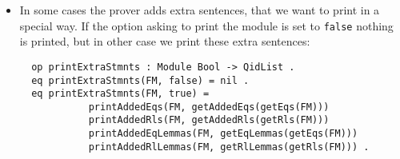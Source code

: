 \begin{itemize}
\item
In some cases the prover adds extra sentences, that we want to print
in a special way. If the option asking to print the module is set to \verb"false"
nothing is printed, but in other case we print these extra sentences:

{\codesize
\begin{verbatim}
  op printExtraStmnts : Module Bool -> QidList .
  eq printExtraStmnts(FM, false) = nil .
  eq printExtraStmnts(FM, true) =
            printAddedEqs(FM, getAddedEqs(getEqs(FM)))
            printAddedRls(FM, getAddedRls(getRls(FM)))
            printAddedEqLemmas(FM, getEqLemmas(getEqs(FM)))
            printAddedRlLemmas(FM, getRlLemmas(getRls(FM))) .
\end{verbatim}
}

{\codesize
\begin{comment}
  op printAddedEqs : Module EquationSet -> QidList .
  eq printAddedEqs(M, none) = nil .
  ceq printAddedEqs(M, eq T = T' [AtS] . EqS) =
                  ('\n '\t '\s '\s '\g 'eq QILL '\s '\o QIL1
                   '\n '\t '\s '\s '\s '\s '\g '= '\s '\o QIL2
                   '\s QIL3 '. '\b
                   ' '--> 'Equation 'added 'by 'the 'prover. '\o
                   printAddedEqs(M, EqS))
   if QIL1 := eMetaPrettyPrint(M, T) /\
      QIL2 := eMetaPrettyPrint(M, T') /\
      QIL3 := printCafeAtS(AtS) /\
      QILL := printLabel(AtS) .

  ceq printAddedEqs(M, ceq T = T' if C [AtS] . EqS) =
                  ('\n '\t '\s '\s '\g 'ceq QILL '\s '\o QIL1
                   '\n '\t '\s '\s '\s '\s '\g '= '\s '\o QIL2
                   '\n '\t '\s '\s '\s '\s '\g 'if '\o '\s QIL3
                   '\s QIL4 '. '\b
                   ' '--> 'Equation 'added 'by 'the 'prover. '\o
                   printAddedEqs(M, EqS))
   if QIL1 := eMetaPrettyPrint(M, T) /\
      QIL2 := eMetaPrettyPrint(M, T') /\
      QIL3 := eMetaPrettyPrint(M, C) /\
      QIL4 := printCafeAtS(AtS) /\
      QILL := printLabel(AtS) .

  op printAddedRls : Module RuleSet -> QidList .
  eq printAddedRls(M, none) = nil .
  ceq printAddedRls(M, rl T => T' [AtS] . RS) =
                  ('\n '\t '\s '\s '\g 'trans QILL '\s '\o QIL1
                   '\n '\t '\s '\s '\s '\s '\g '=> '\s '\o QIL2
                   '\s QIL3 '. '\b
                   ' '--> 'Transition 'added 'by 'the 'prover. '\o
                   printAddedRls(M, RS))
   if QIL1 := eMetaPrettyPrint(M, T) /\
      QIL2 := eMetaPrettyPrint(M, T') /\
      QIL3 := printCafeAtS(AtS) /\
      QILL := printLabel(AtS) .


\end{comment}}
\end{itemize}
